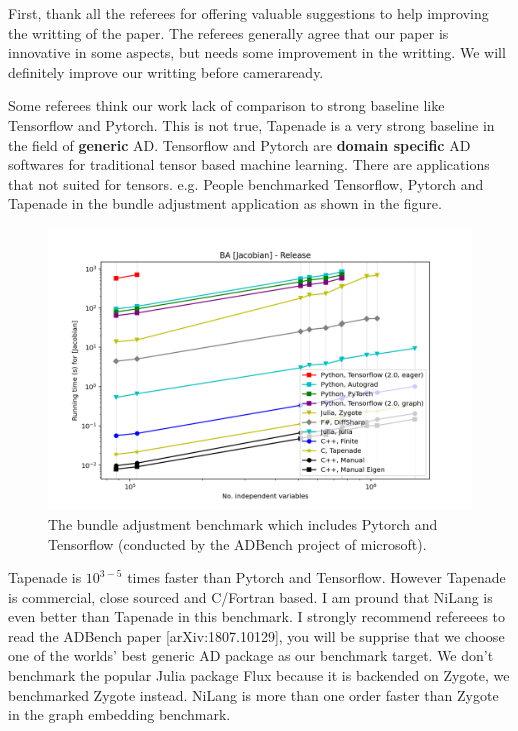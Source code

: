 \documentclass{article}
\begin{document}
First, thank all the referees for offering valuable suggestions to help improving the writting of the paper.
The referees generally agree that our paper is innovative in some aspects, but needs some improvement in the writting.
We will definitely improve our writting before cameraready.

Some referees think our work lack of comparison to strong baseline like Tensorflow and Pytorch.
This is not true, Tapenade is a very strong baseline in the field of \textbf{generic} AD.
Tensorflow and Pytorch are \textbf{domain specific} AD softwares for traditional tensor based machine learning.
There are applications that not suited for tensors.
e.g. People benchmarked Tensorflow, Pytorch and Tapenade in the bundle adjustment application as shown in the figure.
\begin{figure}
    \centerline{\includegraphics[width=0.5\columnwidth,trim={0 0cm 0 0cm},clip]{ba-jacobian-adbench.png}}
    \caption{The bundle adjustment benchmark which includes Pytorch and Tensorflow (conducted by the ADBench project of microsoft).}\label{bench-ba}
\end{figure}
Tapenade is $10^{3-5}$ times faster than Pytorch and Tensorflow. However Tapenade is commercial, close sourced and C/Fortran based.
I am pround that NiLang is even better than Tapenade in this benchmark.
I strongly recommend refereees to read the ADBench paper [arXiv:1807.10129], you will be supprise that we choose one of the worlds' best generic AD package as our benchmark target.
We don't benchmark the popular Julia package Flux because it is backended on Zygote, we benchmarked Zygote instead. NiLang is more than one order faster than Zygote in the graph embedding benchmark.
\end{document}
